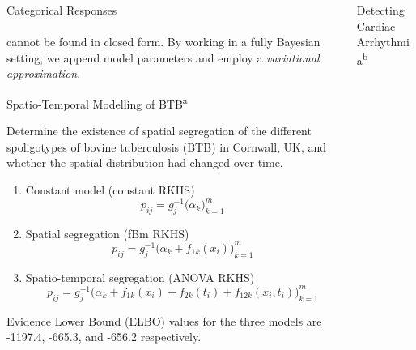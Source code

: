 \documentclass{beamer}
\newlength{\onecolwid}
\newlength{\twocolwid}
\newlength{\threecolwid}
\begin{document}
\begin{frame}[t]
\begin{columns}[t]
\begin{column}{\threecolwid}
\begin{columns}[t,totalwidth=\threecolwid]
\begin{columns}[t,totalwidth=\twocolwid]
\begin{column}{\twocolwid}
\begin{columns}[t,totalwidth=\twocolwid]
\begin{column}{\onecolwid}
\begin{block}{Categorical Responses}
\[\]
~\\[-4pt]
cannot be found in closed form.
By working in a fully Bayesian setting, we append model parameters and employ a \emph{variational approximation}.
 
\end{block}

\begin{block}{Spatio-Temporal Modelling of BTB\textsuperscript{a}}
\vspace{2pt}

Determine the existence of spatial segregation of the different spoligotypes of bovine tuberculosis (BTB) in Cornwall, UK, and whether the spatial distribution had changed over time.

\begin{enumerate}
  \item Constant model (constant RKHS)
  \vspace{5pt}
  \[
    p_{ij} = g^{-1}_j\big( \alpha_k \big)_{k=1}^m
  \]
  \vspace{-32pt}
  \item Spatial segregation (fBm RKHS)
  \vspace{3pt}
  \[
    p_{ij} = g^{-1}_j\big(\alpha_k + f_{1k}(x_i) \big)_{k=1}^m
  \]
  \vspace{-34pt}  
  \item Spatio-temporal segregation (ANOVA RKHS)
  \vspace{6pt}
  \[
    p_{ij} = g^{-1}_j\big(\alpha_k + f_{1k}(x_i) + f_{2k}(t_i) + f_{12k}(x_i,t_i) \big)_{k=1}^m
  \]
  \vspace{-38pt}
\end{enumerate}  

Evidence Lower Bound (ELBO) values for the three models are -1197.4, -665.3, and -656.2 respectively.
\end{block}


\end{column}

\begin{column}{\onecolwid}

\begin{block}{Detecting Cardiac Arrhythmia\textsuperscript{b}}
\vspace{2pt}
  

\end{block}
\end{column}
\end{columns}
\end{column}
\end{columns}
\end{columns}
\end{column}
\end{columns}
\end{frame}
\end{document}
